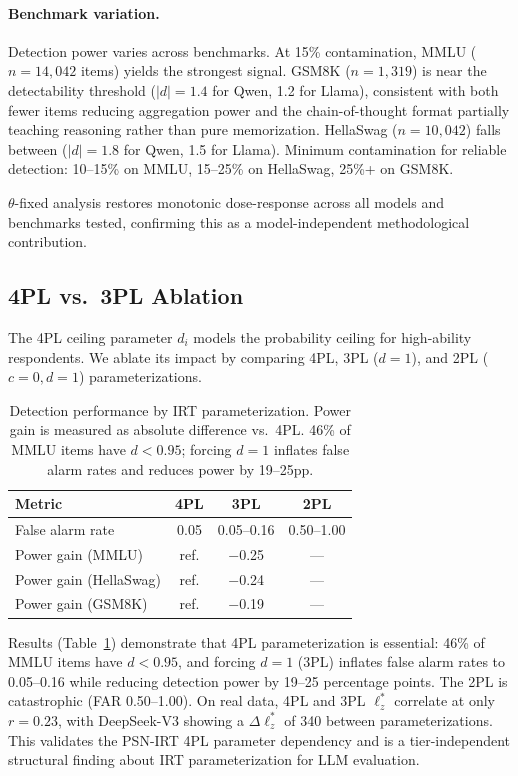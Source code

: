 \documentclass[11pt,a4paper]{article}
\begin{document}
\paragraph{Benchmark variation.}

Detection power varies across benchmarks. At 15\% contamination, MMLU ($n = 14{,}042$ items) yields the strongest signal. GSM8K ($n = 1{,}319$) is near the detectability threshold ($|d| = 1.4$ for Qwen, 1.2 for Llama), consistent with both fewer items reducing aggregation power and the chain-of-thought format partially teaching reasoning rather than pure memorization. HellaSwag ($n = 10{,}042$) falls between ($|d| = 1.8$ for Qwen, 1.5 for Llama). Minimum contamination for reliable detection: 10--15\% on MMLU, 15--25\% on HellaSwag, 25\%+ on GSM8K.

$\theta$-fixed analysis restores monotonic dose-response across all models and benchmarks tested, confirming this as a model-independent methodological contribution.

\subsection{4PL vs.\ 3PL Ablation}\label{sec:4pl_ablation}

The 4PL ceiling parameter $d_i$ models the probability ceiling for high-ability respondents. We ablate its impact by comparing 4PL, 3PL ($d=1$), and 2PL ($c=0, d=1$) parameterizations.

\begin{table}[t]
\centering
\small
\begin{tabular}{lccc}
\toprule
\textbf{Metric} & \textbf{4PL} & \textbf{3PL} & \textbf{2PL} \\
\midrule
False alarm rate & 0.05 & 0.05--0.16 & 0.50--1.00 \\
Power gain (MMLU) & ref. & $-$0.25 & --- \\
Power gain (HellaSwag) & ref. & $-$0.24 & --- \\
Power gain (GSM8K) & ref. & $-$0.19 & --- \\
\bottomrule
\end{tabular}
\caption{Detection performance by IRT parameterization. Power gain is measured as absolute difference vs.\ 4PL. 46\% of MMLU items have $d < 0.95$; forcing $d = 1$ inflates false alarm rates and reduces power by 19--25pp.}
\label{tab:4pl_ablation}
\end{table}

Results (Table~\ref{tab:4pl_ablation}) demonstrate that 4PL parameterization is essential: 46\% of MMLU items have $d < 0.95$, and forcing $d = 1$ (3PL) inflates false alarm rates to 0.05--0.16 while reducing detection power by 19--25 percentage points. The 2PL is catastrophic (FAR 0.50--1.00). On real data, 4PL and 3PL $\ell_z^*$ correlate at only $r = 0.23$, with DeepSeek-V3 showing a $\Delta\ell_z^*$ of 340 between parameterizations. This validates the PSN-IRT 4PL parameter dependency and is a tier-independent structural finding about IRT parameterization for LLM evaluation.
\end{document}
